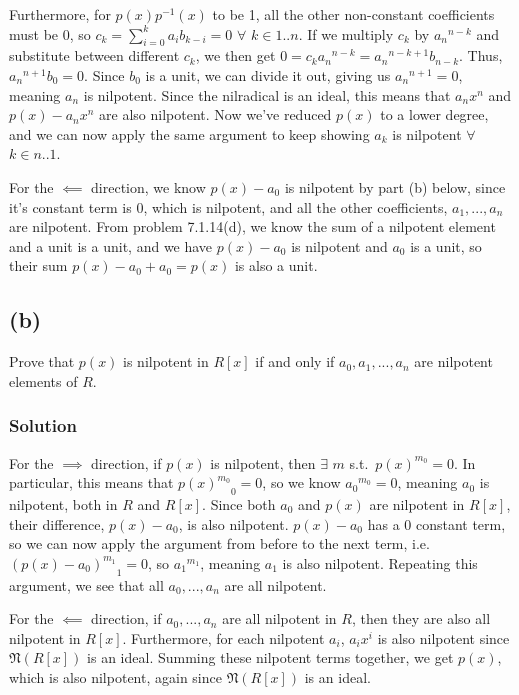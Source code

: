\documentclass[fleqn]{article}
\begin{document}
            Furthermore, for $p(x)p^{-1}(x)$ to be 1, all the other non-constant coefficients must be 0, so $c_k = \sum\limits_{i = 0}^{k} a_i b_{k - i} = 0$ $\forall$ $k \in 1..n$.  If we multiply $c_k$ by ${a_n}^{n - k}$ and substitute between different $c_k$, we then get $0 = c_k {a_n}^{n - k} = {a_n}^{n - k + 1} b_{n - k}$.  Thus, ${a_n}^{n + 1} b_0 = 0$.  Since $b_0$ is a unit, we can divide it out, giving us ${a_n}^{n + 1} = 0$, meaning $a_n$ is nilpotent.  Since the nilradical is an ideal, this means that $a_n x^n$ and $p(x) - a_n x^n$ are also nilpotent.  Now we've reduced $p(x)$ to a lower degree, and we can now apply the same argument to keep showing $a_k$ is nilpotent $\forall$ $k \in n..1$.
            
            For the $\impliedby$ direction, we know $p(x) - a_0$ is nilpotent by part (b) below, since it's constant term is 0, which is nilpotent, and all the other coefficients, $a_1, ..., a_n$ are nilpotent.  From problem 7.1.14(d), we know the sum of a nilpotent element and a unit is a unit, and we have $p(x) - a_0$ is nilpotent and $a_0$ is a unit, so their sum $p(x) - a_0 + a_0 = p(x)$ is also a unit.
        
        
        \subsection{(b)}
        Prove that $p(x)$ is nilpotent in $R[x]$ if and only if $a_0, a_1, ..., a_n$ are nilpotent elements of $R$.
        
            \subsubsection{Solution}
            For the $\implies$ direction, if $p(x)$ is nilpotent, then $\exists$ $m$ s.t.\ $p(x)^{m_0} = 0$.  In particular, this means that ${p(x)^{m_0}}_0 = 0$, so we know ${a_0}^{m_0} = 0$, meaning $a_0$ is nilpotent, both in $R$ and $R[x]$.  Since both $a_0$ and $p(x)$ are nilpotent in $R[x]$, their difference, $p(x) - a_0$, is also nilpotent.  $p(x) - a_0$ has a 0 constant term, so we can now apply the argument from before to the next term, i.e.\ ${(p(x) - a_0)^{m_1}}_1 = 0$, so ${a_1}^{m_1}$, meaning $a_1$ is also nilpotent.  Repeating this argument, we see that all $a_0, ..., a_n$ are all nilpotent.
            
            For the $\impliedby$ direction, if $a_0, ..., a_n$ are all nilpotent in $R$, then they are also all nilpotent in $R[x]$.  Furthermore, for each nilpotent $a_i$, $a_i x^i$ is also nilpotent since $\mathfrak{N}(R[x])$ is an ideal.  Summing these nilpotent terms together, we get $p(x)$, which is also nilpotent, again since $\mathfrak{N}(R[x])$ is an ideal.
    
\end{document}
